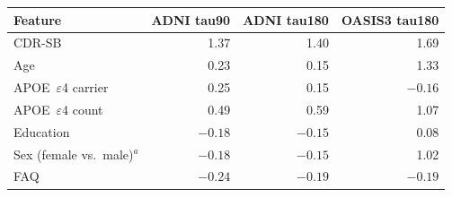 \begin{tabular}{lrrr}
\toprule
Feature & ADNI tau90 & ADNI tau180 & OASIS3 tau180 \\
\midrule
CDR-SB & 1.37 & 1.40 & 1.69 \\
Age & 0.23 & 0.15 & 1.33 \\
APOE~$\varepsilon$4 carrier & 0.25 & 0.15 & $-0.16$ \\
APOE~$\varepsilon$4 count & 0.49 & 0.59 & 1.07 \\
Education & $-0.18$ & $-0.15$ & 0.08 \\
Sex (female vs.\ male)$^{a}$ & $-0.18$ & $-0.15$ & 1.02 \\
FAQ & $-0.24$ & $-0.19$ & $-0.19$ \\
\bottomrule
\end{tabular}
